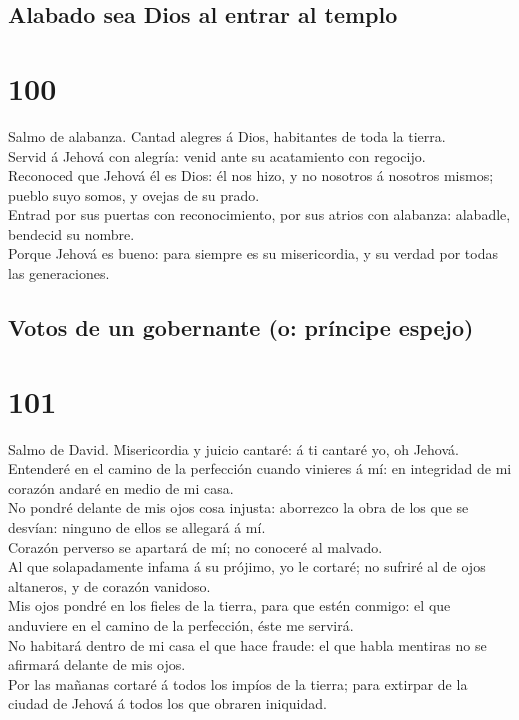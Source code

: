 \hypertarget{alabado-sea-dios-al-entrar-al-templo}{%
\subsection{Alabado sea Dios al entrar al
templo}\label{alabado-sea-dios-al-entrar-al-templo}}

\hypertarget{section-99}{%
\section{100}\label{section-99}}

 Salmo de alabanza. Cantad alegres á Dios, habitantes de
toda la tierra.\\
 Servid á Jehová con alegría: venid ante su acatamiento
con regocijo.\\
 Reconoced que Jehová él es Dios: él nos hizo, y no
nosotros á nosotros mismos; pueblo suyo somos, y ovejas de su prado.\\
 Entrad por sus puertas con reconocimiento, por sus atrios
con alabanza: alabadle, bendecid su nombre.\\
 Porque Jehová es bueno: para siempre es su misericordia,
y su verdad por todas las generaciones.

\hypertarget{votos-de-un-gobernante-o-pruxedncipe-espejo}{%
\subsection{Votos de un gobernante (o: príncipe
espejo)}\label{votos-de-un-gobernante-o-pruxedncipe-espejo}}

\hypertarget{section-100}{%
\section{101}\label{section-100}}

 Salmo de David. Misericordia y juicio cantaré: á ti
cantaré yo, oh Jehová.\\
 Entenderé en el camino de la perfección cuando vinieres á
mí: en integridad de mi corazón andaré en medio de mi casa.\\
 No pondré delante de mis ojos cosa injusta: aborrezco la
obra de los que se desvían: ninguno de ellos se allegará á mí.\\
 Corazón perverso se apartará de mí; no conoceré al
malvado.\\
 Al que solapadamente infama á su prójimo, yo le cortaré;
no sufriré al de ojos altaneros, y de corazón vanidoso.\\
 Mis ojos pondré en los fieles de la tierra, para que
estén conmigo: el que anduviere en el camino de la perfección, éste me
servirá.\\
 No habitará dentro de mi casa el que hace fraude: el que
habla mentiras no se afirmará delante de mis ojos.\\
 Por las mañanas cortaré á todos los impíos de la tierra;
para extirpar de la ciudad de Jehová á todos los que obraren iniquidad.


